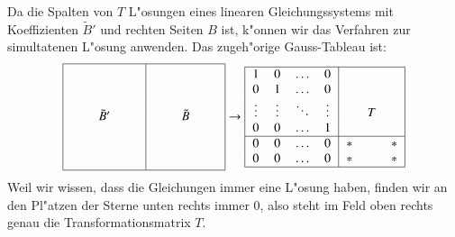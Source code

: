 Da die Spalten von $T$ L"osungen eines linearen Gleichungssystems
mit Koeffizienten $\tilde B'$ und rechten Seiten $B$ ist, k"onnen
wir das Verfahren zur simultatenen L"osung anwenden. Das zugeh"orige
Gauss-Tableau ist:
\[
\begin{tabular}{|>{$}c<{$}>{$}c<{$}>{$}c<{$}|>{$}c<{$}>{$}c<{$}>{$}c<{$}|}
\hline
\quad\mathstrut&         &\quad\mathstrut&\quad\mathstrut&        &\quad\mathstrut\\
      &         &      &      &        &      \mathstrut\\
      &         &      &      &        &      \mathstrut\\
      &\tilde B'&      &      &\tilde B&      \mathstrut\\
      &         &      &      &        &      \mathstrut\\
      &         &      &      &        &      \mathstrut\\
      &         &      &      &        &      \mathstrut\\
\hline
\end{tabular}
\rightarrow
\begin{tabular}{|>{$}c<{$}>{$}c<{$}>{$}c<{$}>{$}c<{$}|>{$}c<{$}>{$}c<{$}>{$}c<{$}|}
\hline
1     &     0&\dots   &0      & &        & \\
0     &     1&\dots   &0      & &        & \\
\vdots&\vdots&\ddots  &\vdots & &   T    & \\
0     &     0&\dots   &1      & &        & \\
\hline
0     &     0&\dots   &0      &*&        &*\\
0     &     0&\dots   &0      &*&        &*\\
\hline
\end{tabular}
\]
Weil wir wissen, dass die Gleichungen immer eine L"osung haben, finden
wir an den Pl"atzen der Sterne unten rechts immer $0$, also steht im
Feld oben rechts genau die Transformationsmatrix $T$.

